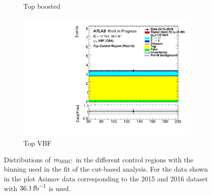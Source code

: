 \begin{figure}[htb]
\begin{subfigure}[t]{0.45\textwidth}
        \caption{Top boosted}
    \end{subfigure}
    \begin{subfigure}[t]{0.45\textwidth}
        \includegraphics[width=\textwidth]{./plots/fit/cba/top_vbf.pdf}
        \caption{Top VBF}
    \end{subfigure}

    \caption{Distributions of $m_\text{MMC}$ in the different control regions with the binning used in the fit of the cut-based analysis.
             For the data shown in the plot Asimov data corresponding to the 2015 and 2016 dataset with $\SI{36.1}{\invfb}$ is used.}\label{fig:fit:input:cba:CR}
\end{figure}


